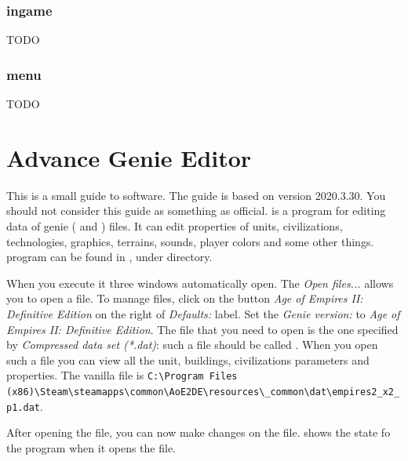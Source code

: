 \begin{appendices}
    \subsection{ingame}

    TODO

    \subsection{menu}

    TODO


    \chapter{Advance Genie Editor}
    \label{chp:genieeditor}

    This is a small guide to \genie{} software. The guide is based on version 2020.3.30. You should not consider this guide as something as official. \genie{} is a program for editing data of genie ( and ) files. It can edit properties of units, civilizations, technologies, graphics, terrains, sounds, player colors and some other things\cite{TurnupHyperion4:2019}.
    \genie{} program can be found in \aoeexedir{}, under  directory.

    When you execute it three windows automatically open. The \textit{Open files...} allows you to open a \genie{} file. To manage \aoe{} files, click on the button \textit{Age of Empires II: Definitive Edition} on the right of \textit{Defaults:} label. Set the \textit{Genie version:} to \textit{Age of Empires II: Definitive Edition}.
    The file that you need to open is the one specified by \textit{Compressed data set (*.dat)}: such a file should be called . When you open such a file you can view all the unit, buildings, civilizations parameters and properties. The vanilla file is \verb|C:\Program Files (x86)\Steam\steamapps\common\AoE2DE\resources\_common\dat\empires2_x2_p1.dat|.

    After opening the file, you can now make changes on the file.  shows the state fo the program when it opens the file. 


\end{appendices}
